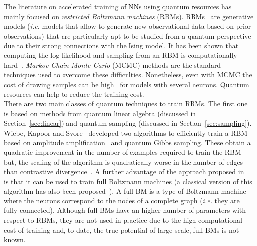\documentclass[a4paper, 11pt]{article}
\begin{document}
The literature on accelerated training of NNs using quantum resources has mainly focused on \textit{restricted Boltzmann machines} (RBMs). RBMs~\cite{smolensky1986information} are generative models (\textit{i.e.} models that allow to generate new observational data based on prior observations) that are particularly apt to be studied from a quantum perspective due to their strong connections with the Ising model. It has been shown that computing the log-likelihood and sampling from an RBM is computationally hard~\cite{long2010restricted}. \textit{Markov Chain Monte Carlo} (MCMC) methods are the standard techniques used to overcome these difficulties. Nonetheless, even with MCMC the cost of drawing samples can be high~\cite{dumoulin2014challenges} for models with several neurons. Quantum resources can help to reduce the training cost. \\

There are two main classes of quantum techniques to train RBMs. The first one is based on methods from quantum linear algebra (discussed in Section~\ref{sec:linear}) and quantum sampling (discussed in Section~\ref{sec:sampling}). Wiebe, Kapoor and Svore~\cite{wiebe2014quantum} developed two algorithms to efficiently train a RBM based on amplitude amplification~\cite{brassard2002quantum} and quantum Gibbs sampling. These obtain a quadratic improvement in the number of examples required to train the RBM but, the scaling of the algorithm is quadratically worse in the number of edges than contrastive divergence~\cite{hinton2002training}. A further advantage of the approach proposed in~\cite{wiebe2014quantum} is that it can be used to train full Boltzmann machines (a classical version of this algorithm has also been proposed~\cite{wiebe2015quantum}). A full BM is a type of Boltzmann machine where the neurons correspond to the nodes of a complete graph (\textit{i.e.} they are fully connected). Although full BMs have an higher number of parameters with respect to RBMs, they are not used in practice due to the high computational cost of training and, to date, the true potential of large scale, full BMs is not known.\\
\end{document}
